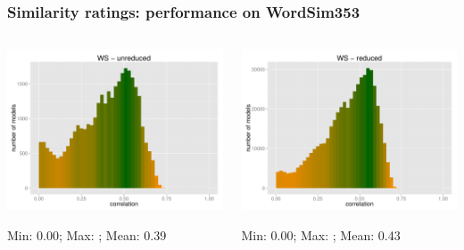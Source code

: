 \documentclass[t]{beamer} %
\begin{document}
\begin{frame}
  \frametitle{Similarity ratings: performance on WordSim353}
  \centering
  
  \begin{columns}

    \begin{column}{0.5\textwidth}
      \centering
      \hspace*{-18pt} \includegraphics[scale=0.30]{img/lapesa_hist_ws_unreduced}
      \begin{block}{}\footnotesize \centering
        Min:  0.00; Max: ;  Mean: 0.39\\
      \end{block}
    \end{column}
    \begin{column}{0.5\textwidth}
      \hspace*{-18pt} 
      \includegraphics[scale=0.30]{img/lapesa_hist_ws_reduced}
      \begin{block}{}\footnotesize \centering
        Min:  0.00; Max: ;  Mean: 0.43\\
      \end{block}
    \end{column}
  \end{columns}  
\end{frame}
\end{document}
